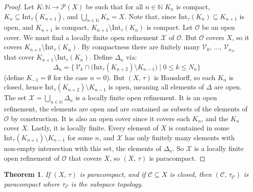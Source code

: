 \documentclass{article}
\theoremstyle{plain}
\newtheorem{theorem}{Theorem}[section]
\theoremstyle{normal}
\begin{document}
        \begin{proof}
            Let $K:\mathbb{N}\rightarrow\mathcal{P}(X)$ be such that
            for all $n\in\mathbb{N}$ $K_{n}$ is compact,
            $K_{n}\subseteq\textrm{Int}_{\tau}(K_{n+1})$, and
            $\bigcup_{n\in\mathbb{N}}K_{n}=X$. Note that, since
            $\textrm{Int}_{\tau}(K_{n})\subseteq{K}_{n+1}$ is open, and
            $K_{n+1}$ is compact, $K_{n+1}\setminus\textrm{Int}_{\tau}(K_{n})$
            is compact. Let $\mathcal{O}$ be an open cover. We must find a
            locally finite open refinement $\mathcal{X}$ of $\mathcal{O}$.
            But $\mathcal{O}$ covers $X$, so it covers
            $K_{n+1}\setminus\textrm{Int}_{\tau}(K_{n})$. By compactness there
            are finitely many $\mathcal{V}_{0},\,\dots,\,\mathcal{V}_{n_{N}}$
            that cover $K_{n+1}\setminus\textrm{Int}_{\tau}(K_{n})$.
            Define $\Delta_{n}$ via:
            \begin{equation}
                \Delta_{n}=
                \Big\{\,\mathcal{V}_{k}\cap\big(\textrm{Int}_{\tau}(K_{n+2})
                    \setminus{K}_{n-1}\big)\;|\;0\leq{k}\leq{N}_{n}\Big\}
            \end{equation}
            (define $K_{-1}=\emptyset$ for the case $n=0$).
            But $(X,\,\tau)$ is Hausdorff, so each $K_{n}$ is closed, hence
            $\textrm{Int}_{\tau}(K_{n+2})\setminus{K}_{n-1}$ is open, meaning
            all elements of $\Delta$ are open. The set
            $\mathcal{X}=\bigcup_{n\in\mathbb{N}}\Delta_{n}$ is a locally finite
            open refinement. It is an open refinement, the elements are open
            and are contained as subsets of the elements of $\mathcal{O}$ by
            construction. It is also an open cover since it covers each
            $K_{n}$, and the $K_{n}$ cover $X$. Lastly, it is locally finite.
            Every element of $X$ is contained in some
            $\textrm{Int}_{\tau}(K_{n+1})\setminus{K}_{n-1}$ for some $n$,
            and $\mathcal{X}$ has only finitely many elements with non-empty
            intersection with this set, the elements of $\Delta_{n}$. So
            $\mathcal{X}$ is a locally finite open refinement of $\mathcal{O}$
            that covers $X$, so $(X,\,\tau)$ is paracompact.
        \end{proof}
        \begin{theorem}
            If $(X,\,\tau)$ is paracompact, and if $\mathcal{C}\subseteq{X}$ is
            closed, then $(\mathcal{C},\,\tau_{\mathcal{C}})$ is paracompact
            where $\tau_{\mathcal{C}}$ is the subspace topology.
        \end{theorem}
\end{document}
